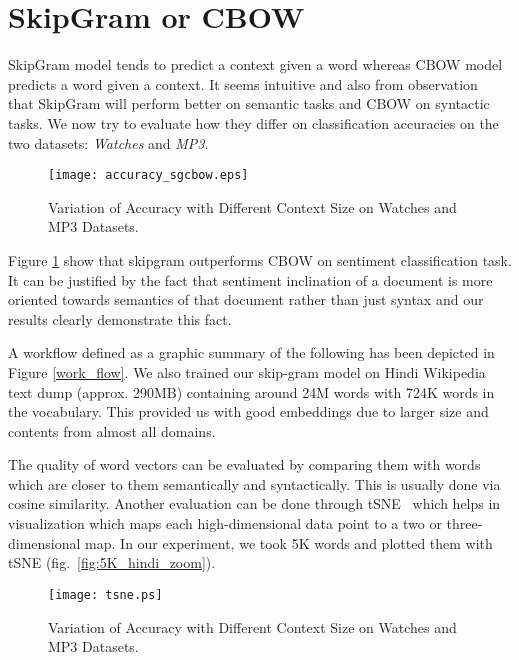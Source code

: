 \section{SkipGram or CBOW}
SkipGram model tends to predict a context given a word whereas CBOW model predicts a word given a context. It seems intuitive and also from observation~\cite{Mikolov:13b} that SkipGram will perform better on semantic tasks and CBOW on syntactic tasks. We now try to evaluate how they differ on classification accuracies on the two datasets: \emph{Watches} and \emph{MP3}.
\begin{figure}[!ht]
\centering
\texttt{[image: accuracy\_sgcbow.eps]}
\caption{Variation of Accuracy with Different Context Size on Watches and MP3 Datasets. \label{fig:accuracy_sgcbow}}
\end{figure}
Figure \ref{fig:accuracy_sgcbow} show that skipgram outperforms CBOW on sentiment classification task. It can be justified by the fact that sentiment inclination of a document is more oriented towards semantics of that document rather than just syntax and our results clearly demonstrate this fact.

A workflow defined as a graphic summary of the following has been depicted in Figure \ref{work_flow}.
We also trained our skip-gram model on Hindi Wikipedia text dump (approx. 290MB) containing around 24M words with 724K words in the vocabulary. This provided us with good embeddings due to larger size and contents from almost all domains.

The quality of word vectors can be evaluated by comparing them with words which are closer to them semantically and syntactically. This is usually done via cosine similarity.  Another evaluation can be done through tSNE~\cite{Maaten:08} which helps in visualization which maps each high-dimensional data point to a two or three-dimensional map. In our experiment, we took 5K words and plotted
them with tSNE (fig.~\ref{fig:5K_hindi_zoom}). 

\begin{figure}[ht]
\centering
\texttt{[image: tsne.ps]}
\caption{Variation of Accuracy with Different Context Size on Watches and MP3 Datasets. \label{fig:context_size}}
\end{figure}

%

